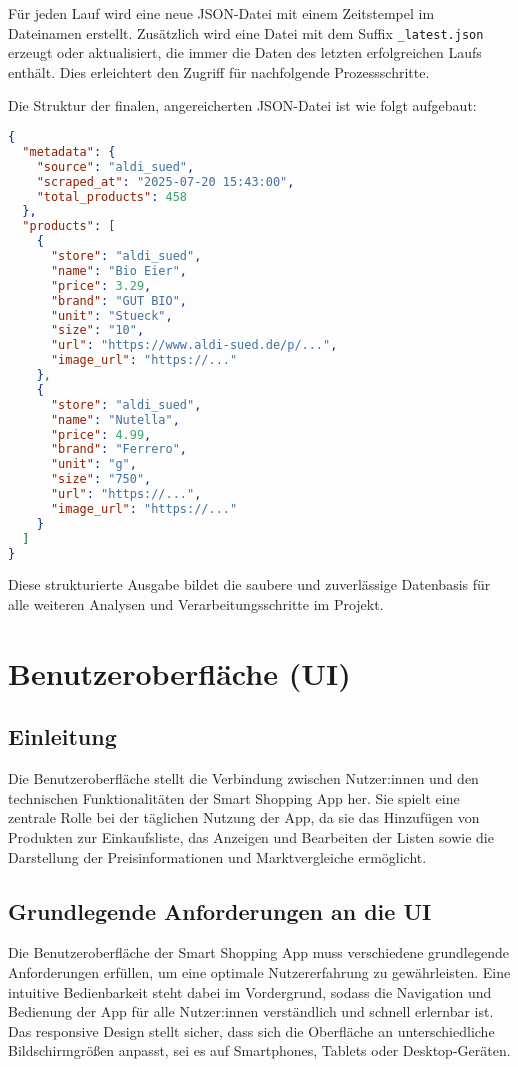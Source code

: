 \documentclass[12pt, a4paper]{report} %
\begin{document}
Für jeden Lauf wird eine neue JSON-Datei mit einem Zeitstempel im Dateinamen erstellt. Zusätzlich wird eine Datei mit dem Suffix \texttt{\_latest.json} erzeugt oder aktualisiert, die immer die Daten des letzten erfolgreichen Laufs enthält. Dies erleichtert den Zugriff für nachfolgende Prozessschritte.

Die Struktur der finalen, angereicherten JSON-Datei ist wie folgt aufgebaut:
\begin{lstlisting}[language=JSON, caption={Beispielhafte JSON-Struktur der finalen Ausgabedatei}]
{
  "metadata": {
    "source": "aldi_sued",
    "scraped_at": "2025-07-20 15:43:00",
    "total_products": 458
  },
  "products": [
    {
      "store": "aldi_sued",
      "name": "Bio Eier",
      "price": 3.29,
      "brand": "GUT BIO",
      "unit": "Stueck",
      "size": "10",
      "url": "https://www.aldi-sued.de/p/...",
      "image_url": "https://..."
    },
    {
      "store": "aldi_sued",
      "name": "Nutella",
      "price": 4.99,
      "brand": "Ferrero",
      "unit": "g",
      "size": "750",
      "url": "https://...",
      "image_url": "https://..."
    }
  ]
}
\end{lstlisting}
Diese strukturierte Ausgabe bildet die saubere und zuverlässige Datenbasis für alle weiteren Analysen und Verarbeitungsschritte im Projekt.

\chapter{Benutzeroberfläche (UI)}
\label{chap:ui}

\section{Einleitung}
Die Benutzeroberfläche stellt die Verbindung zwischen Nutzer:innen und den technischen Funktionalitäten der Smart Shopping App her. Sie spielt eine zentrale Rolle bei der täglichen Nutzung der App, da sie das Hinzufügen von Produkten zur Einkaufsliste, das Anzeigen und Bearbeiten der Listen sowie die Darstellung der Preisinformationen und Marktvergleiche ermöglicht.

\section{Grundlegende Anforderungen an die UI}
Die Benutzeroberfläche der Smart Shopping App muss verschiedene grundlegende Anforderungen erfüllen, um eine optimale Nutzererfahrung zu gewährleisten. Eine intuitive Bedienbarkeit steht dabei im Vordergrund, sodass die Navigation und Bedienung der App für alle Nutzer:innen verständlich und schnell erlernbar ist. Das responsive Design stellt sicher, dass sich die Oberfläche an unterschiedliche Bildschirmgrößen anpasst, sei es auf Smartphones, Tablets oder Desktop-Geräten.
\end{document}
